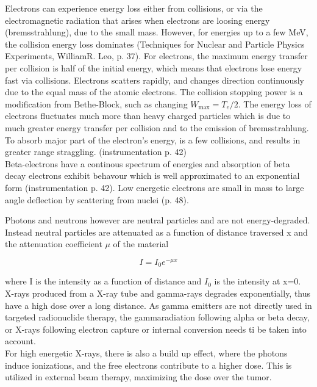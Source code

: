 \documentclass[a4paper,11pt,twoside]{book}
\begin{document}
Electrons can experience energy loss either  from  collisions, or via the electromagnetic radiation that arises when electrons are loosing energy (bremsstrahlung), due to the small mass. However, for energies up to a few MeV, the collision energy loss dominates (Techniques for Nuclear and Particle Physics Experiments, WilliamR. Leo, p.  37). For electrons, the maximum energy transfer per collision is half of the initial energy, which means that electrons lose energy fast via collisions. Electrons scatters rapidly, and changes direction continuously due to the equal mass of the atomic electrons. The collision stopping power is a modification from Bethe-Block, such as changing $W_\text{max}=T_e/2$. The energy loss of electrons fluctuates much more than heavy charged particles which is due to much greater energy transfer per collision and to the emission of bremsstrahlung. To absorb major part of the electron's energy, is a few collisions, and results in greater range straggling.  (instrumentation p. 42)\\
 
Beta-electrons have a continous spectrum of energies and absorption of beta decay electrons exhibit behavour which is well approximated to an exponential form (instrumentation p. 42). 
Low energetic electrons are small in mass to large angle deflection by scattering from nuclei (p. 48). 

Photons and neutrons however are neutral particles and are not energy-degraded. Instead neutral particles are attenuated as a function of distance traversed x and the attenuation coefficient $\mu$ of the material 

\begin{equation}
    I = I_0 e^{-\mu x}
\end{equation}

where I is the intensity as a function of distance and $I_0$ is the intensity at x=0. 
 X-rays produced from a X-ray tube and gamma-rays degrades exponentially, thus have a high dose over a long distance. As gamma emitters are not directly used in targeted  radionuclide therapy, the gammaradiation following alpha or beta decay, or X-rays following electron capture or internal conversion needs ti be taken into account.\\
 For high energetic X-rays, there is also a build up effect, where the photons induce ionizations, and the free electrons contribute to a higher dose. This is utilized in external beam therapy, maximizing the dose over the tumor. \\
\end{document}
